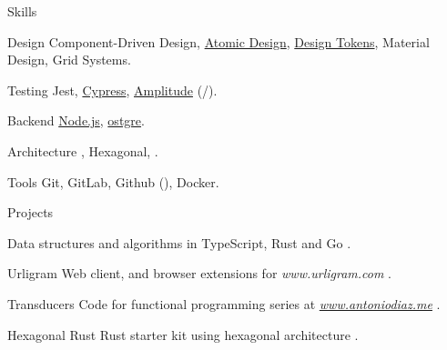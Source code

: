 \documentclass[11pt,a4paper]{article}
\newcommand{\gh}{{\scalebox{0.8}{\faGithub}}}
\begin{document}
\begin{cv}
\begin{cvlist}{Skills}
    \item[Design] Component-Driven Design, \href{https://atomicdesign.bradfrost.com/}{Atomic Design}, \href{https://m3.material.io/foundations/design-tokens/overview}{Design Tokens}, Material Design, Grid Systems.
    \item[Testing] Jest, \href{https://www.cypress.io/}{Cypress}, \href{https://amplitude.com/}{Amplitude} ({}/{}).
    \item[Backend] \href{https://nodejs.org/en/}{Node.js}, \href{https://www.postgresql.org/}{{}ostgre{}}.
    \item[Architecture] {}, Hexagonal, {}.
    \item[Tools] Git, GitLab, Github ({}), Docker.
  \end{cvlist}
  \vspace{0.4em}
  \begin{cvlist}{Projects}
    \item[\sc{dsa}] Data structures and algorithms in TypeScript, Rust and Go \href{https://github.com/antoniodcorrea/data-structures-and-algorithms}{\gh}.
    \item[Urligram] Web client, {} and browser extensions for {\it{www.urligram.com}} \href{https://github.com/antoniodcorrea?tab=repositories&q=topic%3Aurligram}{\gh}.
    \item[Transducers] Code for functional programming series at \href{https://www.antoniodiaz.me/en/blog/functional-javascript-transducers-14}{\it{www.antoniodiaz.me}} \href{https://github.com/antoniodcorrea/blog-functional-programming-suporting-code}{\gh}.
    \item[Hexagonal Rust] Rust {} starter kit using hexagonal architecture \href{https://github.com/antoniodcorrea/rust-api-rest-starter-kit}{\gh}.
  \end{cvlist}
  \cvplace{}
  \vspace{1em}
  \date{\today}
\end{cv}
\end{document}
